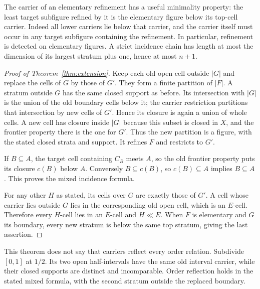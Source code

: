 \documentclass[11pt,a4paper]{article}
\theoremstyle{definition}
\begin{document}
The carrier of an elementary refinement has a useful minimality property: the least target subfigure refined by it is the elementary figure below its top-cell carrier. Indeed all lower carriers lie below that carrier, and the carrier itself must occur in any target subfigure containing the refinement. In particular, refinement is detected on elementary figures. A strict incidence chain has length at most the dimension of its largest stratum plus one, hence at most $n+1$.

\begin{proof}[Proof of Theorem~\ref{thm:extension}]
Keep each old open cell outside $|G|$ and replace the cells of $G$ by those of $G'$. They form a finite partition of $|F|$. A stratum outside $G$ has the same closed support as before. Its intersection with $|G|$ is the union of the old boundary cells below it; the carrier restriction partitions that intersection by new cells of $G'$. Hence its closure is again a union of whole cells. A new cell has closure inside $|G|$ because this subset is closed in $X$, and the frontier property there is the one for $G'$. Thus the new partition is a figure, with the stated closed strata and support. It refines $F$ and restricts to $G'$.

If $B\subseteq A$, the target cell containing $C_B$ meets $A$, so the old frontier property puts its closure $c(B)$ below $A$. Conversely $B\subseteq c(B)$, so $c(B)\subseteq A$ implies $B\subseteq A$. This proves the mixed incidence formula.

For any other $H$ as stated, its cells over $G$ are exactly those of $G'$. A cell whose carrier lies outside $G$ lies in the corresponding old open cell, which is an $E$-cell. Therefore every $H$-cell lies in an $E$-cell and $H\ll E$. When $F$ is elementary and $G$ its boundary, every new stratum is below the same top stratum, giving the last assertion.
\end{proof}
This theorem does not say that carriers reflect every order relation. Subdivide $[0,1]$ at $1/2$. Its two open half-intervals have the same old interval carrier, while their closed supports are distinct and incomparable. Order reflection holds in the stated mixed formula, with the second stratum outside the replaced boundary.
\end{document}
